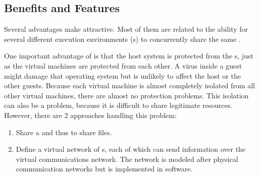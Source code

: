\subsection{Benefits and Features}\label{subsubsec:VM_Benefits_Features}
Several advantages make  attractive.
Most of them are related to the ability for several different execution environments (s) to concurrently share the same .

One important advantage of  is that the host system is protected from the s, just as the virtual machines are protected from each other.
A virus inside a guest  might damage that operating system but is unlikely to affect the host or the other guests.
Because each virtual machine is almost completely isolated from all other virtual machines, there are almost no protection problems.
This isolation can also be a problem, because it is difficult to share legitimate resources.
However, there are 2 approaches handling this problem:
\begin{enumerate}[noitemsep]
\item Share a   and thus to share files.
\item Define a virtual network of s, each of which can send information over the virtual communications network.
  The network is modeled after physical communication networks but is implemented in software.
\end{enumerate}


